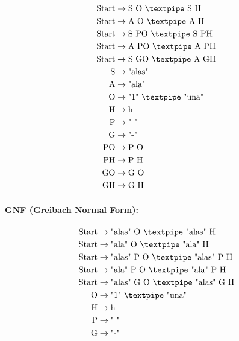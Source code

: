 \begin{equation*}
    \begin{aligned}
        \text{Start}   & \rightarrow \text{S O {\textpipe} S H} \\
        \text{Start}   & \rightarrow \text{A O {\textpipe} A H} \\
        \text{Start}   & \rightarrow \text{S PO {\textpipe} S PH} \\
        \text{Start}   & \rightarrow \text{A PO {\textpipe} A PH} \\
        \text{Start}   & \rightarrow \text{S GO {\textpipe} A GH} \\
        \text{S}    & \rightarrow \text{"alas"}\\
        \text{A}    & \rightarrow \text{"ala"}\\
        \text{O}   & \rightarrow \text{"1" {\textpipe} "una"}\\
        \text{H}   & \rightarrow \text{h}\\
        \text{P}   & \rightarrow \text{" "}\\
        \text{G} & \rightarrow \text{"-"}\\
        \text{PO}      & \rightarrow \text{P O}\\
        \text{PH}      & \rightarrow \text{P H}\\
        \text{GO}      & \rightarrow \text{G O}\\
        \text{GH}      & \rightarrow \text{G H}
    \end{aligned}
\end{equation*}

\paragraph{GNF (Greibach Normal Form):}

\begin{equation*}
    \begin{aligned}
        \text{Start}   & \rightarrow \text{"alas" O {\textpipe} "alas" H} \\
        \text{Start}   & \rightarrow \text{"ala" O {\textpipe} "ala" H} \\
        \text{Start}   & \rightarrow \text{"alas" P O {\textpipe} "alas" P H} \\
        \text{Start}   & \rightarrow \text{"ala" P O {\textpipe} "ala" P H} \\
        \text{Start}   & \rightarrow \text{"alas" G O {\textpipe} "alas" G H} \\
        \text{O}   & \rightarrow \text{"1" {\textpipe} "una"}\\
        \text{H}   & \rightarrow \text{h}\\
        \text{P}   & \rightarrow \text{" "}\\
        \text{G} & \rightarrow \text{"-"}
    \end{aligned}
\end{equation*}

